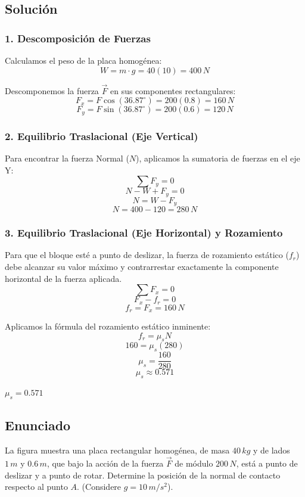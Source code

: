 \documentclass[12pt, a4paper]{article}
\begin{document}
\subsection*{Solución}

\subsubsection*{1. Descomposición de Fuerzas}
Calculamos el peso de la placa homogénea:
$$W = m \cdot g = 40(10) = 400 \, \si{N}$$

Descomponemos la fuerza $\vec{F}$ en sus componentes rectangulares:
$$F_x = F \cos(36.87^\circ) = 200(0.8) = 160 \, \si{N}$$
$$F_y = F \sin(36.87^\circ) = 200(0.6) = 120 \, \si{N}$$

\subsubsection*{2. Equilibrio Traslacional (Eje Vertical)}
Para encontrar la fuerza Normal ($N$), aplicamos la sumatoria de fuerzas en el eje Y:
$$\sum F_y = 0$$
$$N - W + F_y = 0$$
$$N = W - F_y$$
$$N = 400 - 120 = 280 \, \si{N}$$

\subsubsection*{3. Equilibrio Traslacional (Eje Horizontal) y Rozamiento}
Para que el bloque esté a punto de deslizar, la fuerza de rozamiento estático ($f_r$) debe alcanzar su valor máximo y contrarrestar exactamente la componente horizontal de la fuerza aplicada.
$$\sum F_x = 0$$
$$F_x - f_r = 0$$
$$f_r = F_x = 160 \, \si{N}$$

Aplicamos la fórmula del rozamiento estático inminente:
$$f_r = \mu_s N$$
$$160 = \mu_s (280)$$
$$\mu_s = \frac{160}{280}$$
$$\mu_s \approx 0.571$$

\begin{tcolorbox}[colback=green!5!white, colframe=green!50!black, title=Respuesta Final]
\centering \Large $\mu_s = 0.571$
\end{tcolorbox}

\newpage

\subsection*{Enunciado}
La figura muestra una placa rectangular homogénea, de masa $40 \, \si{kg}$ y de lados $1 \, \si{m}$ y $0.6 \, \si{m}$, que bajo la acción de la fuerza $\vec{F}$ de módulo $200 \, \si{N}$, está a punto de deslizar y a punto de rotar. Determine la posición de la normal de contacto respecto al punto $A$. (Considere $g=10\,\si{m/s^2}$).
\end{document}
